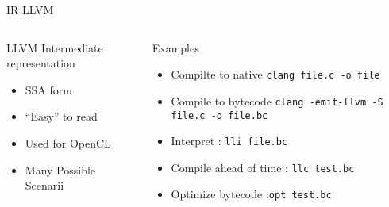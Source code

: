%
\begin{Frame}{IR LLVM}
  \begin{columns}[t]
    \begin{column}{\BW} %
      \begin{block}{LLVM Intermediate representation}
        \begin{itemize}
        \item SSA form
        \item ``Easy'' to read
        \item Used for OpenCL
        \item Many Possible Scenarii 
        \end{itemize}
      \end{block} 
    \end{column}
    
    \begin{column}{\BW} %
      \begin{block}{Examples}
        \begin{itemize}
        \item Compilte to native \texttt{clang file.c -o file}
        \item Compile to bytecode \texttt{clang -emit-llvm -S file.c -o file.bc}
        \item Interpret : \texttt{lli file.bc}
        \item Compile ahead of time : \texttt{llc test.bc}
        \item Optimize bytecode  :\texttt{opt test.bc}
        \end{itemize}
      \end{block}   
    \end{column}
  \end{columns}  
\end{Frame}


